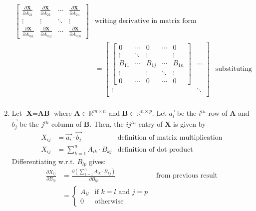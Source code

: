 \documentclass[11pt]{article}
\newcommand{\pd}[2]{\frac{\partial #1}{\partial #2}}
\begin{document}
\begin{enumerate}
\begin{align*}
\begin{bmatrix}
            \pd{\textbf{X}}{A_{21}} & \pd{\textbf{X}}{A_{22}} & \cdots & \pd{\textbf{X}}{A_{2n}} \\
            \vdots & \vdots & \ddots & \vdots \\
            \pd{\textbf{X}}{A_{m1}} & \pd{\textbf{X}}{A_{m2}} & \cdots & \pd{\textbf{X}}{A_{mn}}
        \end{bmatrix} & \text{writing derivative in matrix form} \\
        &= \begin{bmatrix}
            \begin{bmatrix}
                0 & \cdots & 0 & \cdots & 0 \\
                \vdots & \ddots & \vdots & & \vdots \\
                B_{11} & \cdots & B_{1j} & \cdots & B_{1n} \\
                \vdots & & \vdots & \ddots & \vdots \\
                0 & \cdots & 0 & \cdots & 0
            \end{bmatrix} & \cdots \\
            \vdots & \ddots \\
        \end{bmatrix} & \text{substituting previous result} \\
    \end{align*}
    \item Let $\textbf{X} = \textbf{AB}$ where $\textbf{A} \in \mathbb{R}^{m \times n}$ and $\textbf{B} \in \mathbb{R}^{n \times p}$. Let $\vec{a_i}$ be the $i^{th}$ row of $\textbf{A}$ and $\vec{b_j}$ be the $j^{th}$ column of $\textbf{B}$. Then, the $ij^{th}$ entry of $\textbf{X}$ is given by
    \begin{align*}
        X_{ij} &= \vec{a_i} \cdot \vec{b_j} & \text{definition of matrix multiplication} \\
        X_{ij} &= \sum_{k=1}^{n} A_{ik} \cdot B_{kj} & \text{definition of dot product}
    \end{align*}
    Differentiating w.r.t. $B_{lp}$ gives:
    \begin{align*}
        \pd{X_{ij}}{B_{lp}} &= \pd{(\sum_{k=1}^{n} A_{ik} \cdot B_{kj})}{B_{lp}} & \text{from previous result} \\
        &= \begin{cases}
            A_{il} & \text{if } k = l \text{ and } j = p \\
            0 & \text{otherwise}
        \end{cases} \\

\end{align*}
\end{enumerate}
\end{document}
